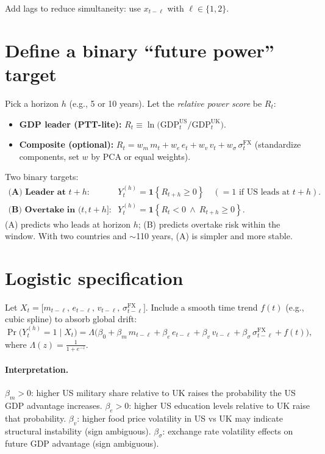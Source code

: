 \documentclass[11pt]{article}
\newcommand{\US}{\mathrm{US}}
\newcommand{\UK}{\mathrm{UK}}
\newcommand{\ind}[1]{\mathbf{1}\!\left\{#1\right\}}
\begin{document}
\medskip
\noindent Add lags to reduce simultaneity: use $x_{t-\ell}$ with $\ell\in\{1,2\}$.

\section{Define a binary ``future power'' target}

Pick a horizon $h$ (e.g., 5 or 10 years). Let the \emph{relative power score} be $R_t$:
\begin{itemize}[leftmargin=1.5em]
  \item \textbf{GDP leader (PTT-lite):} \quad $R_t \equiv \ln\!\big(\mathrm{GDP}^{\US}_t/\mathrm{GDP}^{\UK}_t\big)$.
  \item \textbf{Composite (optional):} \quad $R_t = w_m\,m_t + w_e\,e_t + w_v\,v_t + w_{\sigma}\,\sigma^{\text{FX}}_t$ (standardize components, set $w$ by PCA or equal weights).
\end{itemize}

Two binary targets:
\begin{align*}
\textbf{(A) Leader at } t+h:\quad
&Y^{(h)}_t = \ind{R_{t+h}\ge 0} 
\quad(=1 \text{ if US leads at } t+h).\\
\textbf{(B) Overtake in } (t,t+h]:\quad
&Y^{(h)}_t = \ind{R_t<0 \ \land\ R_{t+h}\ge 0}.
\end{align*}
(A) predicts who leads at horizon $h$; (B) predicts overtake risk within the window. With two countries and $\sim$110 years, (A) is simpler and more stable.

\section{Logistic specification}

Let $X_t = \big[m_{t-\ell},\, e_{t-\ell},\, v_{t-\ell},\, \sigma^{\text{FX}}_{t-\ell}\big]$. Include a smooth time trend $f(t)$ (e.g., cubic spline) to absorb global drift:
\[
\Pr\!\big(Y^{(h)}_t=1 \mid X_t\big)
= \Lambda\!\Big(\beta_0 + \beta_m\,m_{t-\ell}
+ \beta_e\,e_{t-\ell} + \beta_v\,v_{t-\ell} + \beta_{\sigma}\,\sigma^{\text{FX}}_{t-\ell} + f(t)\Big),
\]
where $\Lambda(z)=\frac{1}{1+e^{-z}}$.

\paragraph{Interpretation.}
$\beta_m>0$: higher US military share relative to UK raises the probability the US GDP advantage increases.
$\beta_e>0$: higher US education levels relative to UK raise that probability.
$\beta_v$: higher food price volatility in US vs UK may indicate structural instability (sign ambiguous).
$\beta_{\sigma}$: exchange rate volatility effects on future GDP advantage (sign ambiguous).
\end{document}
